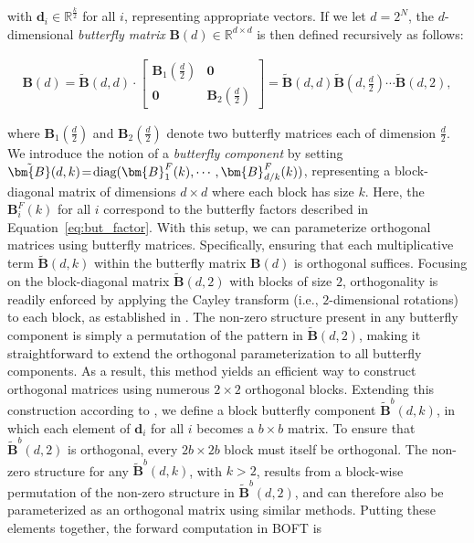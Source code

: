with $\bm{d}_i\in\mathbb{R}^{\frac{k}{2}}$ for all $i$, representing appropriate vectors. If we let $d=2^N$, the $d$-dimensional \emph{butterfly matrix} $\bm{B}(d)\in\mathbb{R}^{d\times d}$ is then defined recursively as follows:

\begin{equation}
\begin{aligned}
    \!\!\bm{B}(d)=\tilde{\bm{B}}(d,d)\!\cdot\!\begin{bmatrix}
    \bm{B}_1(\frac{d}{2})\!\!\!\!\! & \bm{0} \\
    \bm{0}\!\!\!\!\! &\bm{B}_2(\frac{d}{2})
    \end{bmatrix}= \tilde{\bm{B}}(d,d)\tilde{\bm{B}}(d,\frac{d}{2})\cdots\tilde{\bm{B}}(d,2),
\end{aligned}
\end{equation}

where $\bm{B}_1(\frac{d}{2})$ and $\bm{B}_2(\frac{d}{2})$ denote two butterfly matrices each of dimension $\frac{d}{2}$. We introduce the notion of a \emph{butterfly component} by setting $\thickmuskip=2mu \medmuskip=2mu \tilde{\bm{B}}(d,k)=\text{diag}(\bm{B}^F_1(k),\cdots,\bm{B}^F_{d/k}(k))$, representing a block-diagonal matrix of dimensions $d\times d$ where each block has size $k$. Here, the $\bm{B}^F_i(k)$ for all $i$ correspond to the butterfly factors described in Equation~\ref{eq:but_factor}. With this setup, we can parameterize orthogonal matrices using butterfly matrices. Specifically, ensuring that each multiplicative term $\tilde{\bm{B}}(d,k)$ within the butterfly matrix $\bm{B}(d)$ is orthogonal suffices. Focusing on the block-diagonal matrix $\tilde{\bm{B}}(d,2)$ with blocks of size $2$, orthogonality is readily enforced by applying the Cayley transform (i.e., $2$-dimensional rotations) to each block, as established in \cite{liu2021orthogonal,qiu2023controlling}. The non-zero structure present in any butterfly component is simply a permutation of the pattern in $\tilde{\bm{B}}(d,2)$, making it straightforward to extend the orthogonal parameterization to all butterfly components. As a result, this method yields an efficient way to construct orthogonal matrices using numerous $2\times2$ orthogonal blocks. Extending this construction according to \cite{chen2022pixelated}, we define a block butterfly component $\tilde{\bm{B}}^b(d,k)$, in which each element of $\bm{d}_i$ for all $i$ becomes a $b\times b$ matrix. To ensure that $\tilde{\bm{B}}^b(d,2)$ is orthogonal, every $2b\times2b$ block must itself be orthogonal. The non-zero structure for any $\tilde{\bm{B}}^b(d,k)$, with $k>2$, results from a block-wise permutation of the non-zero structure in $\tilde{\bm{B}}^b(d,2)$, and can therefore also be parameterized as an orthogonal matrix using similar methods. Putting these elements together, the forward computation in BOFT is


